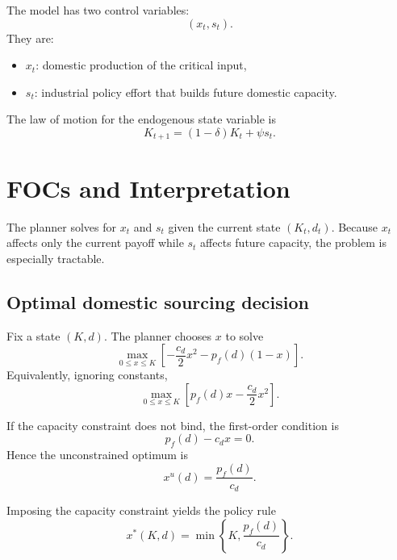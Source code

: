 \documentclass[11pt]{article}
\begin{document}
The model has two control variables:
\begin{equation}
(x_t,s_t).
\end{equation}
They are:
\begin{itemize}[leftmargin=2em]
    \item $x_t$: domestic production of the critical input,
    \item $s_t$: industrial policy effort that builds future domestic capacity.
\end{itemize}

The law of motion for the endogenous state variable is
\begin{equation}
K_{t+1}=(1-\delta)K_t+\psi s_t.
\end{equation}

\section{FOCs and Interpretation}

The planner solves for $x_t$ and $s_t$ given the current state $(K_t,d_t)$. Because $x_t$ affects only the current payoff while $s_t$ affects future capacity, the problem is especially tractable.

\subsection{Optimal domestic sourcing decision}

Fix a state $(K,d)$. The planner chooses $x$ to solve
\begin{equation}
\max_{0\le x\le K}
\left[
-\frac{c_d}{2}x^2-p_f(d)(1-x)
\right].
\end{equation}
Equivalently, ignoring constants,
\begin{equation}
\max_{0\le x\le K}
\left[
p_f(d)x-\frac{c_d}{2}x^2
\right].
\end{equation}

If the capacity constraint does not bind, the first-order condition is
\begin{equation}
p_f(d)-c_d x = 0.
\end{equation}
Hence the unconstrained optimum is
\begin{equation}
x^{u}(d)=\frac{p_f(d)}{c_d}.
\end{equation}

Imposing the capacity constraint yields the policy rule
\begin{equation}
x^*(K,d)=\min\left\{K,\frac{p_f(d)}{c_d}\right\}.
\end{equation}
\end{document}
